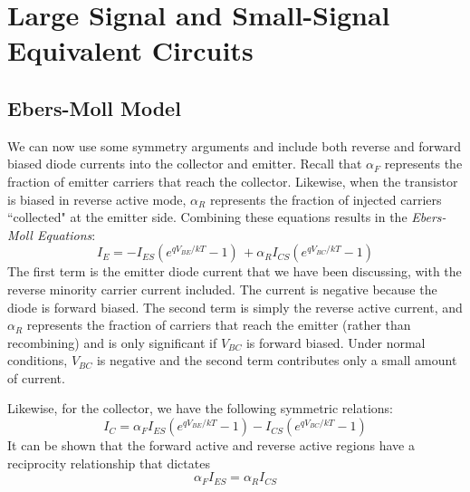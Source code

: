 \section{Large Signal and Small-Signal Equivalent Circuits}
\subsection{Ebers-Moll Model}
We can now use some symmetry arguments and include both reverse and forward biased diode currents into the collector and emitter.   Recall that $\alpha_F$ represents the fraction of emitter carriers that reach the collector.  Likewise, when the transistor is biased in reverse active mode, $\alpha_R$ represents the fraction of injected carriers ``collected" at the emitter side.  Combining these equations results in the \emph{Ebers-Moll Equations}:
    \begin{equation}
        {I_E} =  - {I_{ES}}\left( {{e^{{qV_{BE}}/{kT}}} - 1} \right)\, + {\alpha _R}{I_{CS}}\left( {{e^{{qV_{BC}}/{kT}}} - 1} \right)
    \end{equation}
The first term is the emitter diode current that we have been discussing, with the reverse minority carrier current included.  The current is negative because the diode is forward biased.  The second term is simply the reverse active current, and $\alpha_R$ represents the fraction of carriers that reach the emitter (rather than recombining) and is only significant if $V_{BC}$ is forward biased.  Under normal conditions, $V_{BC}$ is negative and the second term contributes only a small amount of current.  

Likewise, for the collector, we have the following symmetric relations:
    \begin{equation}
        {I_C} = {\alpha _F}{I_{ES}}\left( {{e^{{qV_{BE}}/{kT}}} - 1} \right) - {I_{CS}}\left( {{e^{{qV_{BC}}/{kT}}} - 1} \right)
    \end{equation}
It can be shown that the forward active and reverse active regions have a reciprocity relationship that dictates 
    \begin{equation}
        {\alpha _F}{I_{ES}} = {\alpha _R}{I_{CS}}
    \end{equation}
